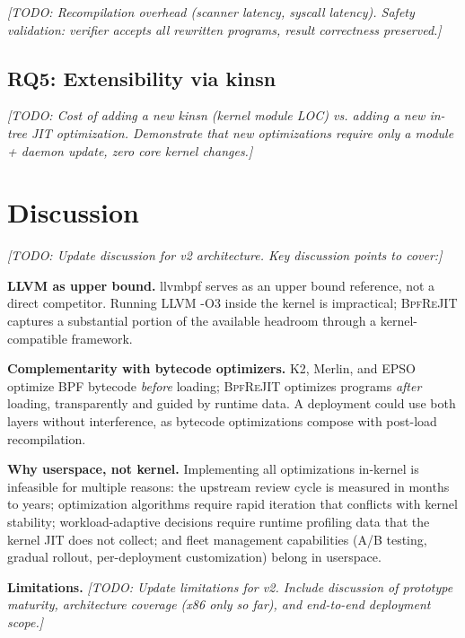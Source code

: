 \documentclass[sigconf,anonymous]{acmart}
\begin{document}
\textit{[TODO: Recompilation overhead (scanner latency, syscall
latency). Safety validation: verifier accepts all rewritten programs,
result correctness preserved.]}

\subsection{RQ5: Extensibility via kinsn}
\label{sec:eval_extensibility}

\textit{[TODO: Cost of adding a new kinsn (kernel module LOC) vs.
adding a new in-tree JIT optimization. Demonstrate that new
optimizations require only a module + daemon update, zero core kernel
changes.]}

\section{Discussion}
\label{sec:discussion}

\textit{[TODO: Update discussion for v2 architecture. Key discussion
points to cover:]}

\textbf{LLVM as upper bound.} llvmbpf serves as an upper bound
reference, not a direct competitor. Running LLVM -O3 inside the kernel
is impractical; \textsc{BpfReJIT} captures a substantial portion of the
available headroom through a kernel-compatible framework.

\textbf{Complementarity with bytecode optimizers.} K2, Merlin, and
EPSO optimize BPF bytecode \emph{before} loading; \textsc{BpfReJIT}
optimizes programs \emph{after} loading, transparently and guided by
runtime data. A deployment could use both layers without interference,
as bytecode optimizations compose with post-load recompilation.

\textbf{Why userspace, not kernel.} Implementing all optimizations
in-kernel is infeasible for multiple reasons: the upstream review cycle
is measured in months to years; optimization algorithms require rapid
iteration that conflicts with kernel stability; workload-adaptive
decisions require runtime profiling data that the kernel JIT does not
collect; and fleet management capabilities (A/B testing, gradual
rollout, per-deployment customization) belong in userspace.

\textbf{Limitations.}
\textit{[TODO: Update limitations for v2. Include discussion of
prototype maturity, architecture coverage (x86 only so far), and
end-to-end deployment scope.]}
\end{document}
